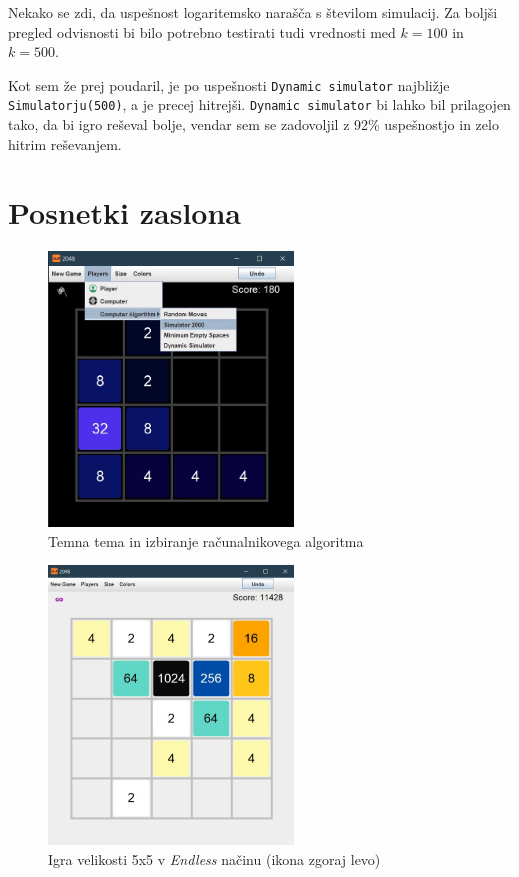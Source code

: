 \documentclass{article}
\begin{document}
Nekako se zdi, da uspešnost logaritemsko narašča s številom simulacij. Za boljši pregled odvisnosti bi bilo potrebno testirati tudi vrednosti med $k=100$ in $k=500$.

Kot sem že prej poudaril, je po uspešnosti \texttt{Dynamic simulator} najbližje \texttt{Simulatorju(500)}, a je precej hitrejši. \texttt{Dynamic simulator} bi lahko bil prilagojen tako, da bi igro reševal bolje, vendar sem se zadovoljil z 92\% uspešnostjo in zelo hitrim reševanjem.

\pagebreak
\section{Posnetki zaslona}

\begin{figure}[ht!]
\centering
\includegraphics[width=6.5cm]{scr1.jpg}
\caption{Temna tema in izbiranje računalnikovega algoritma}
\label{scr1}
\end{figure}

\begin{figure}[ht!]
\centering
\includegraphics[width=6.5cm]{scr2.jpg}
\caption{Igra velikosti 5x5 v \emph{Endless} načinu (ikona zgoraj levo)}
\label{scr2}
\end{figure}
\end{document}
